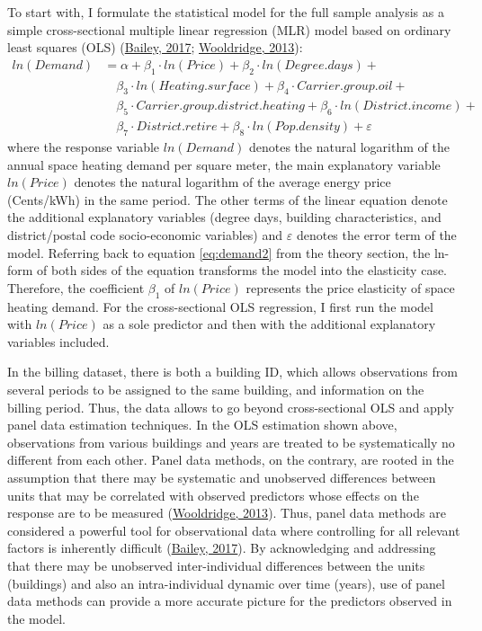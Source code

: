 \documentclass[12pt,twoside]{reedthesis}
\begin{document}
To start with, I formulate the statistical model for the full sample analysis as a simple cross-sectional multiple linear regression (MLR) model based on ordinary least squares (OLS) (\protect\hyperlink{ref-bailey17}{Bailey, 2017}; \protect\hyperlink{ref-wooldridge13}{Wooldridge, 2013}):
\begin{align*}
ln(Demand) & = \alpha + \beta_1 \cdot ln(Price) + \beta_2 \cdot ln(Degree.days) + \\
 & \quad \beta_3 \cdot ln(Heating.surface) + \beta_{4} \cdot Carrier.group.oil + \\
 & \quad \beta_{5} \cdot Carrier.group.district.heating + \beta_{6} \cdot ln(District.income) + \\
 & \quad \beta_{7} \cdot District.retire + \beta_{8} \cdot ln(Pop.density) + \varepsilon 
\end{align*}
where the response variable \(ln(Demand)\) denotes the natural logarithm of the annual space heating demand per square meter, the main explanatory variable \(ln(Price)\) denotes the natural logarithm of the average energy price (Cents/kWh) in the same period. The other terms of the linear equation denote the additional explanatory variables (degree days, building characteristics, and district/postal code socio-economic variables) and \(\varepsilon\) denotes the error term of the model. Referring back to equation \eqref{eq:demand2} from the theory section, the ln-form of both sides of the equation transforms the model into the elasticity case. Therefore, the coefficient \(\beta_1\) of \(ln(Price)\) represents the price elasticity of space heating demand. For the cross-sectional OLS regression, I first run the model with \(ln(Price)\) as a sole predictor and then with the additional explanatory variables included.

In the billing dataset, there is both a building ID, which allows observations from several periods to be assigned to the same building, and information on the billing period. Thus, the data allows to go beyond cross-sectional OLS and apply panel data estimation techniques. In the OLS estimation shown above, observations from various buildings and years are treated to be systematically no different from each other. Panel data methods, on the contrary, are rooted in the assumption that there may be systematic and unobserved differences between units that may be correlated with observed predictors whose effects on the response are to be measured (\protect\hyperlink{ref-wooldridge13}{Wooldridge, 2013}). Thus, panel data methods are considered a powerful tool for observational data where controlling for all relevant factors is inherently difficult (\protect\hyperlink{ref-bailey17}{Bailey, 2017}). By acknowledging and addressing that there may be unobserved inter-individual differences between the units (buildings) and also an intra-individual dynamic over time (years), use of panel data methods can provide a more accurate picture for the predictors observed in the model.
\end{document}
